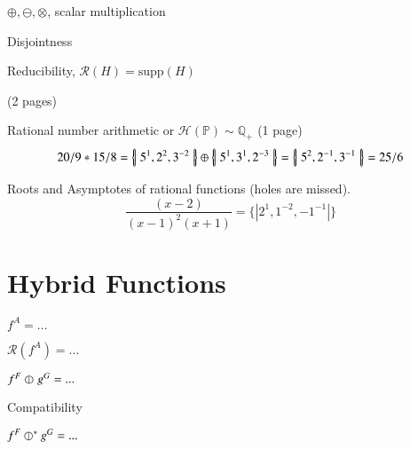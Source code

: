 \begin{definition}
$\oplus , \ominus , \otimes$, scalar multiplication
\end{definition}

\begin{definition}
Disjointness
\end{definition}

\begin{definition}
Reducibility, $\mathcal{R}(H) = \mathrm{supp}(H)$
\end{definition}

(2 pages)

\begin{example}{Rational number arithmetic or $\mathcal{H}(\mathbb{P}) \sim \mathbb{Q}_+$ } (1 page)
\begin{equation}
 20/9 * 15/8 = \hset[5^1, 2^2, 3^{-2}] \oplus \hset[5^1, 3^1, 2^{-3}] = \hset[5^2, 2^{-1}, 3^{-1}] = 25/6
\end{equation}
\end{example}


\begin{example} Roots and Asymptotes of rational functions (holes are missed).
\begin{equation}
\frac{(x-2)}{(x-1)^2(x+1)} = \{\!| 2^1, 1^{-2}, -1^{-1} |\!\}
\end{equation}
\end{example}



\newpage \addtocounter{page}{2}

\section{Hybrid Functions}
\begin{definition}
$f^A = ...$
\end{definition}

\begin{definition}
$\mathcal{R}(f^A) = ...$
\end{definition}

\begin{definition}
$f^F \hjoin[] g^G = ...$
\end{definition}

\begin{definition}
Compatibility
\end{definition}

\begin{definition}
$f^F \hjoin[*] g^G = ...$
\end{definition}


